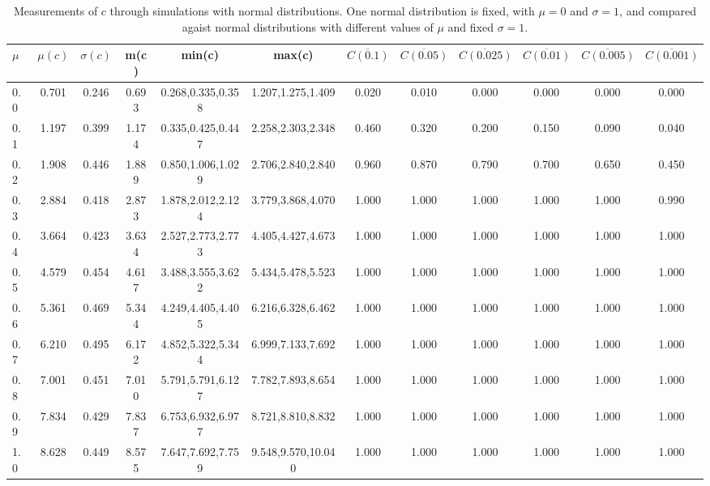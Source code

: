 \begin{table*}[h!]
\begin{center}
\begin{tabular}{| l | c | c | c | c | c | c | c | c | c | c | c |}\hline
$\mu$ & $\mu(c)$ & $\sigma(c)$ & m(c) & min(c) & max(c) & $\overline{C(0.1)}$ & $\overline{C(0.05)}$ & $\overline{C(0.025)}$ & $\overline{C(0.01)}$ & $\overline{C(0.005)}$ & $\overline{C(0.001)}$ \\\hline
0.0 & 0.701 & 0.246 & 0.693 & 0.268,0.335,0.358 & 1.207,1.275,1.409  & 0.020  & 0.010  & 0.000  & 0.000  & 0.000  & 0.000 \\\hline
0.1 & 1.197 & 0.399 & 1.174 & 0.335,0.425,0.447 & 2.258,2.303,2.348  & 0.460  & 0.320  & 0.200  & 0.150  & 0.090  & 0.040 \\\hline
0.2 & 1.908 & 0.446 & 1.889 & 0.850,1.006,1.029 & 2.706,2.840,2.840  & 0.960  & 0.870  & 0.790  & 0.700  & 0.650  & 0.450 \\\hline
0.3 & 2.884 & 0.418 & 2.873 & 1.878,2.012,2.124 & 3.779,3.868,4.070  & 1.000  & 1.000  & 1.000  & 1.000  & 1.000  & 0.990 \\\hline
0.4 & 3.664 & 0.423 & 3.634 & 2.527,2.773,2.773 & 4.405,4.427,4.673  & 1.000  & 1.000  & 1.000  & 1.000  & 1.000  & 1.000 \\\hline
0.5 & 4.579 & 0.454 & 4.617 & 3.488,3.555,3.622 & 5.434,5.478,5.523  & 1.000  & 1.000  & 1.000  & 1.000  & 1.000  & 1.000 \\\hline
0.6 & 5.361 & 0.469 & 5.344 & 4.249,4.405,4.405 & 6.216,6.328,6.462  & 1.000  & 1.000  & 1.000  & 1.000  & 1.000  & 1.000 \\\hline
0.7 & 6.210 & 0.495 & 6.172 & 4.852,5.322,5.344 & 6.999,7.133,7.692  & 1.000  & 1.000  & 1.000  & 1.000  & 1.000  & 1.000 \\\hline
0.8 & 7.001 & 0.451 & 7.010 & 5.791,5.791,6.127 & 7.782,7.893,8.654  & 1.000  & 1.000  & 1.000  & 1.000  & 1.000  & 1.000 \\\hline
0.9 & 7.834 & 0.429 & 7.837 & 6.753,6.932,6.977 & 8.721,8.810,8.832  & 1.000  & 1.000  & 1.000  & 1.000  & 1.000  & 1.000 \\\hline
1.0 & 8.628 & 0.449 & 8.575 & 7.647,7.692,7.759 & 9.548,9.570,10.040  & 1.000  & 1.000  & 1.000  & 1.000  & 1.000  & 1.000 \\\hline
\end{tabular}
\caption{Measurements of $c$ through simulations
with normal distributions.
One normal distribution is fixed, with $\mu=0$ and $\sigma=1$,
and compared agaist normal distributions with different values of $\mu$ and fixed $\sigma=1$.}
\end{center}
\end{table*}